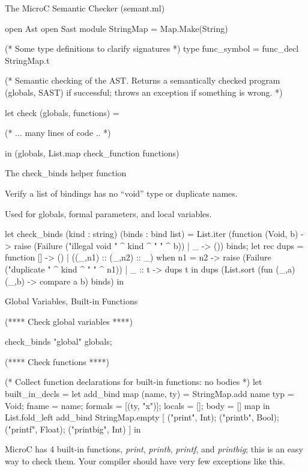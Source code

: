 \documentclass{plt}
\begin{document}
\begin{frame}[fragile=singleslide]{The MicroC Semantic Checker (semant.ml)}

\begin{ocaml}
open Ast
open Sast
module StringMap = Map.Make(String)

(* Some type definitions to clarify signatures *)
type func_symbol = func_decl StringMap.t

(* Semantic checking of the AST. Returns a semantically
   checked program (globals, SAST) if successful;
   throws an exception if something is wrong. *)

let check (globals, functions) =

  (* ... many lines of code .. *) 
  
  in (globals, List.map check_function functions)
\end{ocaml}

\end{frame}

\begin{frame}[fragile=singleslide]{The check\_binds helper function}

Verify a list of bindings has no ``void'' type or duplicate
names.

Used for globals, formal parameters, and local variables.

\begin{ocaml}
let check_binds (kind : string) (binds : bind list) =
  List.iter (function
      (Void, b) -> raise
                    (Failure ("illegal void " ^ kind ^ " " ^ b))
    | _ -> ()) binds;
  let rec dups = function
      [] -> ()
    |	((_,n1) :: (_,n2) :: _) when n1 = n2 ->
        raise (Failure ("duplicate " ^ kind ^ " " ^ n1))
    | _ :: t -> dups t
  in dups (List.sort (fun (_,a) (_,b) -> compare a b) binds)
in  
\end{ocaml}

\end{frame}

\begin{frame}[fragile=singleslide]{Global Variables, Built-in Functions}

\begin{ocaml}
(**** Check global variables ****)

check_binds "global" globals;

(**** Check functions ****)

(* Collect function declarations for built-in functions: no bodies *)
let built_in_decls = 
  let add_bind map (name, ty) = StringMap.add name {
    typ = Void;
    fname = name; 
    formals = [(ty, "x")];
    locals = []; body = [] } map
  in List.fold_left add_bind StringMap.empty [ ("print", Int);
                                               ("printb", Bool);
                                               ("printf", Float);
                                               ("printbig", Int) ]
in
\end{ocaml}

MicroC has 4 built-in functions, \emph{print}, \emph{printb},
\emph{printf}, and \emph{printbig};
this is an easy way to check them.  Your compiler should have very
few exceptions like this.

\end{frame}
\end{document}
